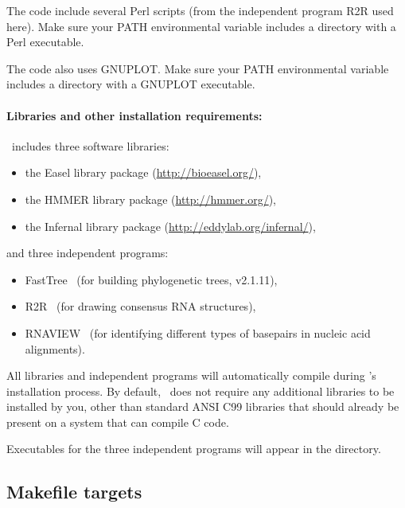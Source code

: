The code include several Perl scripts (from the independent program
R2R used here). Make sure your PATH environmental variable includes a
directory with a Perl executable.

The code also uses GNUPLOT. Make sure your PATH environmental variable includes a
directory with a GNUPLOT executable.

\paragraph{Libraries and other installation requirements:}

\rscape\ includes three software libraries:

\begin{itemize}
\item the Easel library package (\url{http://bioeasel.org/}),
\item the HMMER library package (\url{http://hmmer.org/}),
\item the Infernal library package (\url{http://eddylab.org/infernal/}),
\end{itemize}

and three independent programs:

\begin{itemize}
\item FastTree~\citep{Price10} (for building phylogenetic trees, v2.1.11),
  
\item R2R~\citep{WeinbergBreaker11} (for drawing consensus RNA
  structures),

\item RNAVIEW~\citep{YangWesthof03} (for identifying different types of
  basepairs in nucleic acid alignments).
  
\end{itemize}

 All libraries and independent programs will automatically compile
 during \rscape's installation process.  By default, \rscape\ does not
 require any additional libraries to be installed by you, other than
 standard ANSI C99 libraries that should already be present on a
 system that can compile C code.

 Executables for the three independent programs will appear in the
  directory.

\subsection{Makefile targets}

